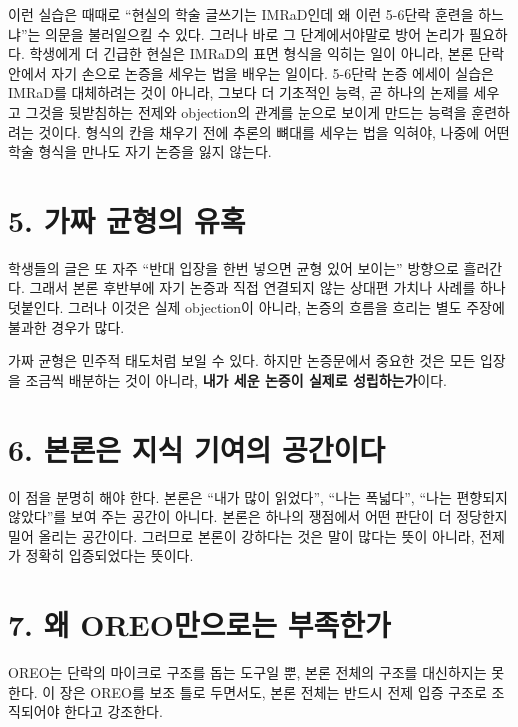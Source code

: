 이런 실습은 때때로 ``현실의 학술 글쓰기는 IMRaD인데 왜 이런 5-6단락 훈련을 하느냐''는 의문을 불러일으킬 수 있다. 그러나 바로 그 단계에서야말로 방어 논리가 필요하다. 학생에게 더 긴급한 현실은 IMRaD의 표면 형식을 익히는 일이 아니라, 본론 단락 안에서 자기 손으로 논증을 세우는 법을 배우는 일이다. 5-6단락 논증 에세이 실습은 IMRaD를 대체하려는 것이 아니라, 그보다 더 기초적인 능력, 곧 하나의 논제를 세우고 그것을 뒷받침하는 전제와 objection의 관계를 눈으로 보이게 만드는 능력을 훈련하려는 것이다. 형식의 칸을 채우기 전에 추론의 뼈대를 세우는 법을 익혀야, 나중에 어떤 학술 형식을 만나도 자기 논증을 잃지 않는다.

\section{5. 가짜 균형의 유혹}\label{5-uxac00uxc9dc-uxade0uxd615uxc758-uxc720uxd639}

학생들의 글은 또 자주 ``반대 입장을 한번 넣으면 균형 있어 보이는'' 방향으로 흘러간다. 그래서 본론 후반부에 자기 논증과 직접 연결되지 않는 상대편 가치나 사례를 하나 덧붙인다. 그러나 이것은 실제 objection이 아니라, 논증의 흐름을 흐리는 별도 주장에 불과한 경우가 많다.

가짜 균형은 민주적 태도처럼 보일 수 있다. 하지만 논증문에서 중요한 것은 모든 입장을 조금씩 배분하는 것이 아니라, \textbf{내가 세운 논증이 실제로 성립하는가}이다.

\section{6. 본론은 지식 기여의 공간이다}\label{6-uxbcf8uxb860uxc740-uxc9c0uxc2dd-uxae30uxc5ecuxc758-uxacf5uxac04uxc774uxb2e4}

이 점을 분명히 해야 한다. 본론은 ``내가 많이 읽었다'', ``나는 폭넓다'', ``나는 편향되지 않았다''를 보여 주는 공간이 아니다. 본론은 하나의 쟁점에서 어떤 판단이 더 정당한지 밀어 올리는 공간이다. 그러므로 본론이 강하다는 것은 말이 많다는 뜻이 아니라, 전제가 정확히 입증되었다는 뜻이다.

\section{7. 왜 OREO만으로는 부족한가}\label{7-uxc65c-oreouxb9ccuxc73cuxb85cuxb294-uxbd80uxc871uxd55cuxac00}

OREO는 단락의 마이크로 구조를 돕는 도구일 뿐, 본론 전체의 구조를 대신하지는 못한다. 이 장은 OREO를 보조 틀로 두면서도, 본론 전체는 반드시 전제 입증 구조로 조직되어야 한다고 강조한다.

